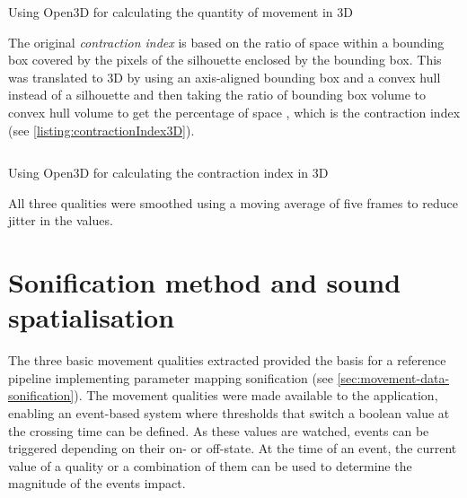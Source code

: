 \begin{listing}[!ht]
\inputminted{python}{04_Artefakte/03_Listings/quantity-of-movement.py}
\caption{Using Open3D for calculating the quantity of movement in \ac{3D}\protect}
\label{listing:quantityOfMovement3D}
\end{listing}

The original \emph{contraction index} is based on the ratio of space within a bounding box covered by the pixels of the silhouette enclosed by the bounding box.
This was translated to \ac{3D} by using an axis-aligned bounding box and a convex hull instead of a silhouette and then taking the ratio of bounding box volume to convex hull volume to get the percentage of space , which is the contraction index (see \autoref{listing:contractionIndex3D}).

\begin{listing}[!ht]
\inputminted{python}{04_Artefakte/03_Listings/contraction-index.py}
\caption{Using Open3D for calculating the contraction index in \ac{3D}\protect}
\label{listing:contractionIndex3D}
\end{listing}

All three qualities were smoothed using a moving average of five frames to reduce jitter in the values.

\section{Sonification method and sound spatialisation}
\label{sec:sonification-method-and-sound-spatialisation}

The three basic movement qualities extracted provided the basis for a reference pipeline implementing parameter mapping sonification (see \autoref{sec:movement-data-sonification}).
The movement qualities were made available to the application, enabling an event-based system where thresholds that switch a boolean value at the crossing time can be defined.
As these values are watched, events can be triggered depending on their on- or off-state.
At the time of an event, the current value of a quality or a combination of them can be used to determine the magnitude of the event\textquotesingle s impact.

